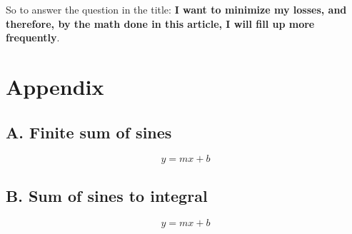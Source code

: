 \documentclass[11pt]{article}
\begin{document}
\par 
So to answer the question in the title: \textbf{I want to minimize my losses, and therefore, by the math done in this article, I will fill up more frequently}.


\section*{Appendix}

\subsection*{A. Finite sum of sines}
\label{subsec:sine_sum}

\renewcommand{\theequation}{A.\arabic{equation}}
\begin{equation}
y = mx+b
\end{equation}

\subsection*{B. Sum of sines to integral}
\label{subsec:sum_to_int}

\renewcommand{\theequation}{B.\arabic{equation}}
\begin{equation}
y = mx+b
\end{equation}
\end{document}
